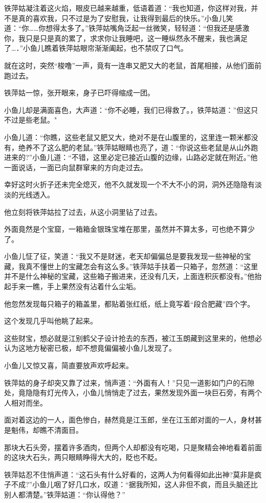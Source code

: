 \documentclass[12pt,oneside]{book}
\begin{document}
铁萍姑凝注着这火焰，眼皮已越来越重，低语着道：``我也知道，你这样对我，并不是真的喜欢我，只不过是为了安慰我，让我得到最后的快乐。''小鱼儿笑道：``你\ldots\ldots 你想得太多了。''铁萍姑嘴角泛起一丝微笑，轻轻道：``但我还是感激你，我只是只是真的累了，求求你让我睡吧，这一睡纵然永不醒来，我也满足了\ldots．''小鱼儿瞧着铁萍姑眼帘渐渐阖起，也不禁叹了口气。

就在这时，突然``梭噜''一声，竟有一连串又肥又大的老鼠，首尾相接，从他们面前跑过去。

铁萍姑一惊，张开眼来，身子已吓得缩成一团。

小鱼儿却是满面喜色，大声道：``你不必睡，我们已得救了。，铁萍姑道：''但这只不过是些老鼠。"

小鱼儿道：``你瞧，这些老鼠又肥又大，绝对不是在山腹里的，这里连一颗米都没有，绝养不了这么肥的老鼠。''铁萍姑眼睛也亮了，道：``你说这些老鼠是从山外跑进来的?''小鱼儿道：``不错，这里必定已接近山腹的边缘，山路必定就在附近。''他一面说话，一面已向鼠群窜来的方向走过去。

幸好这时火折子还未完全熄灭，他不久就发现一个不大不小的洞，洞外还隐隐有淡淡的光线透入。

他立刻将铁萍姑拉了过去，从这小洞里钻了过去。

外面竟然是个宝窟，一箱箱金银珠宝堆在那里，虽然并不算太多，可也绝不算少了。

小鱼儿怔了征，笑道：``我又不是财迷，老天却偏偏总是要我发现一些神秘的宝藏，我真不懂世上的宝藏怎会有这么多。''铁萍姑手扶着一只箱子，忽然道：``这里并不是什么神秘的宝藏，这些箱子搬进来，还没有几天，上面连积灰都没有。''他抬起手来一瞧，手上果然没有沾着什么尘垢。

他忽然发现每只箱子的箱盖里，都贴着张红纸，纸上竟写着``段合肥藏''四个字。

这个发现几乎叫他眺了起来。

这些财宝，想必就是江别鹤父子设计抢去的东西，被江玉朗藏到这里来的，他想必认为这地方秘密已极，却不想竟偏偏被小鱼儿发现了。

小鱼儿又惊又喜，简直要放声欢呼起来。

铁萍姑的身子却突又靠了过来，悄声道：``外面有人！''只见一道影如门户的石隙处，竟隐隐有灯光传入，小鱼儿悄悄走了过去，果然发现外面一块巨石旁，有两个人相对而坐。

面对着这边的一人，面色惨白，赫然竟是江玉郎，坐在江玉郎对面的一人，身材甚是魁伟，却瞧不清面目。

那块大石头旁，摆着许多酒肉，但两个人却都没有吃喝，只是聚精会神地看着前面的这块大石头，两只眼睛睁得大大的，眨也不眨。

铁萍姑忍不住悄声道：``这石头有什么好看的，这两人为何看得如此出神?莫非是疯子不成?''小鱼儿咽了好几口水，叹道：``据我所知，这人非但不疯，而且头脑还比别人都清楚。''铁萍姑道：``你认得他？''
\end{document}
